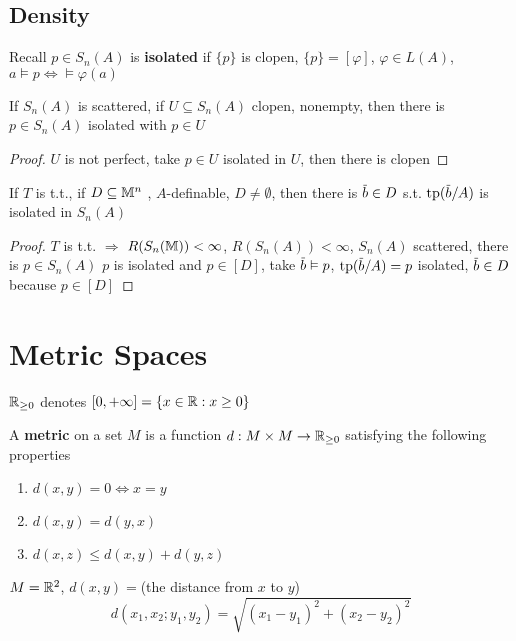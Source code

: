 \documentclass[11pt]{article}
\begin{document}
\subsection{Density}
\label{sec:orge6806df}
Recall \(p\in S_n(A)\) is \textbf{isolated} if \(\{p\}\) is clopen, \(\{p\}=[\varphi]\), \(\varphi\in L(A)\), \(a\vDash p\Leftrightarrow\vDash\varphi(a)\)

\begin{lemma}[]
If \(S_n(A)\) is scattered, if \(U\subseteq S_n(A)\) clopen, nonempty, then there is \(p\in S_n(A)\)
isolated with \(p\in U\)
\end{lemma}

\begin{proof}
\(U\) is not perfect, take \(p\in U\) isolated in \(U\), then there is clopen
\end{proof}

\begin{theorem}[]
If \(T\) is t.t., if \(D\subseteq\mathbb{M}^n\) , \(A\)-definable, \(D\neq\emptyset\), then there is \(\barb\in D\)
s.t. \(\tp(\barb/A)\) is isolated in \(S_n(A)\)
\end{theorem}

\begin{proof}
\(T\) is t.t. \(\Rightarrow\) \(R(S_n(\mathbb{M}))<\infty\), \(R(S_n(A))<\infty\), \(S_n(A)\) scattered, there
is \(p\in S_n(A)\) \(p\) is isolated and \(p\in [D]\), take \(\barb\vDash p\), \(\tp(\barb/A)=p\)
isolated, \(\barb\in D\) because \(p\in [D]\)
\end{proof}

\appendix
\section{Metric Spaces}
\label{sec:orgbcfe031}
\(\mathbb{R}_{\ge 0}\) denotes \([0,+\infty]=\{x\in\mathbb{R}:x\ge 0\}\)
\begin{definition}[]
A \textbf{metric} on a set \(M\) is a function \(d:M\times M\to\mathbb{R}_{\ge 0}\) satisfying the following properties
\begin{enumerate}
\item \(d(x,y)=0\Leftrightarrow x=y\)
\item \(d(x,y)=d(y,x)\)
\item \(d(x,z)\le d(x,y)+d(y,z)\)
\end{enumerate}
\end{definition}

\begin{examplle}[]
\(M=\mathbb{R}^2\), \(d(x,y)=\)(the distance from \(x\) to \(y\))
\begin{equation*}
  d(x_1,x_2;y_1,y_2)=\sqrt{(x_1-y_1)^2+(x_2-y_2)^2}
\end{equation*}
\end{examplle}
\end{document}
